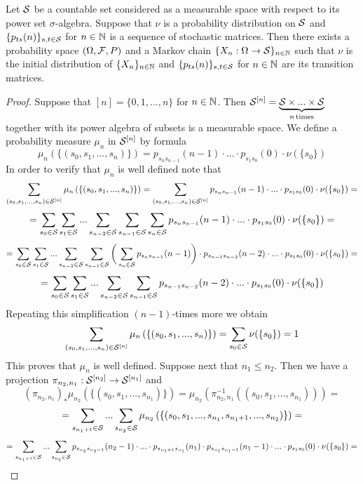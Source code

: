 \begin{theorem}\label{theorem:existence_of_Markov_chain_with_given_initial_distribution_and_transition_matrices}
Let ${\mathcal S}$ be a countable set considered as a measurable space with respect to its power set $\sigma$-algebra. Suppose that $\nu$ is a probability distribution on ${\mathcal S}$ and $\{p_{ts}(n)\}_{s,t\in {\mathcal S}}$ for $n\in {\mathbb N}$ is a sequence of stochastic matrices. Then there exists a probability space $(\Omega,{\mathcal F},P)$ and a Markov chain $\{X_n:\Omega\rightarrow {\mathcal S}\}_{n\in {\mathbb N}}$ such that $\nu$ is the initial distribution of $\{X_n\}_{n\in {\mathbb N}}$ and $\{p_{ts}(n)\}_{s,t\in {\mathcal S}}$ for $n\in {\mathbb N}$ are its transition matrices.
\end{theorem}
\begin{proof}
Suppose that $[n] = \{0,1,...,n\}$ for $n\in {\mathbb N}$. Then ${\mathcal S}^{[n]} = \underbrace{{\mathcal S}\times ...\times {\mathcal S}}_{n\,\mathrm{times}}$ together with its power algebra of subsets is a measurable space. We define a probability measure $\mu_n$ in ${\mathcal S}^{[n]}$ by formula
$$\mu_n\left(\{(s_0,s_1,...,s_n)\}\right) = p_{s_{n}s_{n-1}}(n-1)\cdot ... \cdot p_{s_{1}s_{0}}(0)\cdot \nu(\{s_0\})$$
In order to verify that $\mu_n$ is well defined note that
$$\sum_{(s_0,s_1,...,s_n)\in {\mathcal S}^{[n]}}\mu_n\left(\{(s_0,s_1,...,s_n)\}\right) = \sum_{(s_0,s_1,...,s_n)\in {\mathcal S}^{[n]}}p_{s_{n}s_{n-1}}(n-1)\cdot ... \cdot p_{s_{1}s_{0}}(0)\cdot \nu(\{s_0\}) = $$
$$=\sum_{s_0\in {\mathcal S}}\sum_{s_1\in {\mathcal S}}...\sum_{s_{n-2}\in {\mathcal S}}\sum_{s_{n-1}\in {\mathcal S}}\sum_{s_n\in {\mathcal S}}p_{s_{n}s_{n-1}}(n-1)\cdot ... \cdot p_{s_{1}s_{0}}(0)\cdot \nu(\{s_0\}) =$$
$$= \sum_{s_0\in {\mathcal S}}\sum_{s_1\in {\mathcal S}}...\sum_{s_{n-2}\in {\mathcal S}}\sum_{s_{n-1}\in {\mathcal S}}\bigg(\sum_{s_n\in {\mathcal S}}p_{s_{n}s_{n-1}}(n-1)\bigg)\cdot p_{s_{n-1}s_{n-2}}(n-2)\cdot ... \cdot p_{s_{1}s_{0}}(0)\cdot \nu(\{s_0\})= $$
$$=\sum_{s_0\in {\mathcal S}}\sum_{s_1\in {\mathcal S}}...\sum_{s_{n-2}\in {\mathcal S}}\sum_{s_{n-1}\in {\mathcal S}} p_{s_{n-1}s_{n-2}}(n-2)\cdot ... \cdot p_{s_{1}s_{0}}(0)\cdot \nu(\{s_0\})$$
Repeating this simplification $(n-1)$-times more we obtain
$$\sum_{(s_0,s_1,...,s_n)\in {\mathcal S}^{[n]}}\mu_n\left(\{(s_0,s_1,...,s_n)\}\right) = \sum_{s_0\in {\mathcal S}}\nu(\{s_0\}) = 1$$
This proves that $\mu_n$ is well defined. Suppose next that $n_1\leq n_2$. Then we have a projection $\pi_{n_2,n_1}:{\mathcal S}^{[n_2]}\rightarrow {\mathcal S}^{[n_1]}$ and
$$\left(\pi_{n_2,n_1}\right)_*\mu_{n_2}\left(\{(s_0,s_1,...,s_{n_1})\}\right) = \mu_{n_2}\left(\pi_{n_2,n_1}^{-1}\left((s_0,s_1,...,s_{n_1})\right)\right) = $$
$$=\sum_{s_{n_1+1}\in {\mathcal S}}...\sum_{s_{n_2}\in {\mathcal S}}\mu_{n_2}\left(\{(s_0,s_1,...,s_{n_1},s_{n_1+1},...,s_{n_2})\}\right) =$$
$$= \sum_{s_{n_1+1}\in {\mathcal S}}...\sum_{s_{n_2}\in {\mathcal S}}p_{s_{n_2}s_{n_2-1}}(n_2-1)\cdot ...\cdot p_{s_{n_1 + 1}s_{n_1}}(n_1)\cdot p_{s_{n_1}s_{n_1-1}}(n_1-1) \cdot ...\cdot p_{s_{1}s_{0}}(0)\cdot \nu(\{s_0\})=$$

\end{proof}
